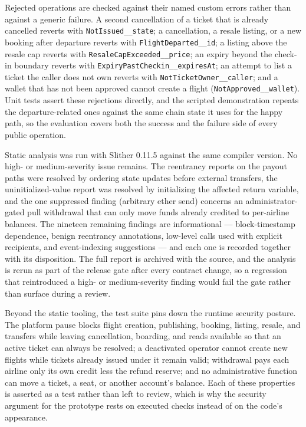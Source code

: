 \documentclass[conference]{IEEEtran}
\begin{document}
Rejected operations are checked against their named custom errors rather than against a generic failure. A second cancellation of a ticket that is already cancelled reverts with \texttt{NotIssued\_\_state}; a cancellation, a resale listing, or a new booking after departure reverts with \texttt{FlightDeparted\_\_id}; a listing above the resale cap reverts with \texttt{ResaleCapExceeded\_\_price}; an expiry beyond the check-in boundary reverts with \texttt{ExpiryPastCheckin\_\_expiresAt}; an attempt to list a ticket the caller does not own reverts with \texttt{NotTicketOwner\_\_caller}; and a wallet that has not been approved cannot create a flight (\texttt{NotApproved\_\_wallet}). Unit tests assert these rejections directly, and the scripted demonstration repeats the departure-related ones against the same chain state it uses for the happy path, so the evaluation covers both the success and the failure side of every public operation.

Static analysis was run with Slither 0.11.5 against the same compiler version. No high- or medium-severity issue remains. The reentrancy reports on the payout paths were resolved by ordering state updates before external transfers, the uninitialized-value report was resolved by initializing the affected return variable, and the one suppressed finding (arbitrary ether send) concerns an administrator-gated pull withdrawal that can only move funds already credited to per-airline balances. The nineteen remaining findings are informational --- block-timestamp dependence, benign reentrancy annotations, low-level calls used with explicit recipients, and event-indexing suggestions --- and each one is recorded together with its disposition. The full report is archived with the source, and the analysis is rerun as part of the release gate after every contract change, so a regression that reintroduced a high- or medium-severity finding would fail the gate rather than surface during a review.

Beyond the static tooling, the test suite pins down the runtime security posture. The platform pause blocks flight creation, publishing, booking, listing, resale, and transfers while leaving cancellation, boarding, and reads available so that an active ticket can always be resolved; a deactivated operator cannot create new flights while tickets already issued under it remain valid; withdrawal pays each airline only its own credit less the refund reserve; and no administrative function can move a ticket, a seat, or another account's balance. Each of these properties is asserted as a test rather than left to review, which is why the security argument for the prototype rests on executed checks instead of on the code's appearance.
\end{document}
